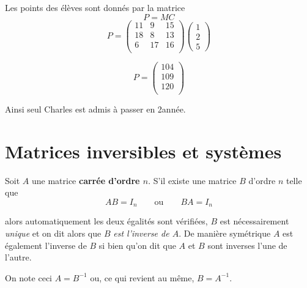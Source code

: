 \documentclass[a4paper,12pt]{book}
\begin{document}
Les points des élèves sont donnés par la matrice $$P=MC$$
$$P = \begin{pmatrix}
11 & 9 & 15 \\
18 & 8 & 13 \\
6 & 17 & 16 \\
\end{pmatrix}\begin{pmatrix}
1\\2\\5
\end{pmatrix}$$

$$P = \begin{pmatrix}
104\\109\\120\\
\end{pmatrix}$$

Ainsi seul Charles est admis à passer en 2\eme année.

\section{Matrices inversibles et systèmes}

\begin{definition}
Soit $A$ une matrice \textbf{carrée d'ordre $n$}. S'il existe une matrice $B$ d'ordre $n$ telle que 
$$AB = I_n\qquad\text{ou}\qquad BA=I_n$$

alors automatiquement les deux égalités sont vérifiées, $B$ est nécessairement \textit{unique} et on dit alors que $B$ \textit{est l'inverse de $A$}. De manière symétrique $A$ est également l'inverse de $B$ si bien qu'on dit que $A$ et $B$ sont inverses l'une de l'autre.

On note ceci $A=B^{-1}$ ou, ce qui revient au même, $B=A^{-1}$.
\end{definition}
\end{document}
